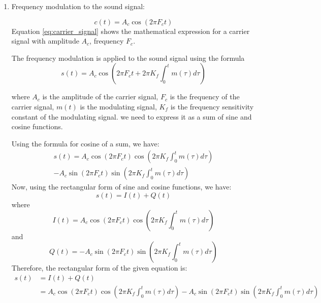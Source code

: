 \documentclass[journal,5pt,twocolumn]{IEEEtran}
\begin{document}
\begin{enumerate}
\begin{tikzpicture}[node distance=3cm, auto]
    
\end{tikzpicture}
 
 \item Frequency modulation to the sound signal:


 \begin{equation}
 c(t) = A_c \cos(2 \pi F_c t )
 \label{eq:carrier_signal} 
 \end{equation}
 Equation \ref{eq:carrier_signal} shows the mathematical expression for a carrier signal with amplitude $A_c$, frequency $F_c$. 
 
 The frequency modulation is applied to the sound signal using the formula
 \begin{equation}
 s(t) = A_c \cos \left(2 \pi F_c t +2\pi K_{f} \int_{0}^t m(\tau) d\tau \right) 
 \end{equation}

 where $A_c$ is the amplitude of the carrier signal, $F_c$ is the frequency of the carrier signal, $m(t)$ is the modulating signal, $K_{f}$ is the frequency sensitivity constant of the modulating signal.
 \iffalse
 we need to express it as a sum of sine and cosine functions.

Using the formula for cosine of a sum, we have:
\begin{align}
s(t) = A_c \cos \left(2 \pi F_c t \right) \cos \left( 2 \pi K_f \int_0^t m(\tau) d\tau \right)\\ - A_c \sin \left(2 \pi F_c t \right) \sin \left( 2 \pi K_f \int_0^t m(\tau) d\tau \right)
\end{align}
Now, using the rectangular form of sine and cosine functions, we have:
\begin{equation}
s(t) = I(t) + Q(t)
\end{equation}
where
\begin{equation}
I(t) = A_c \cos \left(2 \pi F_c t \right) \cos \left( 2 \pi K_f \int_0^t m(\tau) d\tau \right)
\end{equation}
and
\begin{equation}
Q(t) = - A_c \sin \left(2 \pi F_c t \right) \sin \left( 2 \pi K_f \int_0^t m(\tau) d\tau \right)
\end{equation}
Therefore, the rectangular form of the given equation is:
\begin{align}
s(t) &= I(t) + Q(t) 
\\&= A_c \cos \left(2 \pi F_c t \right) \cos \left( 2 \pi K_f \int_0^t m(\tau) d\tau \right) - A_c \sin \left(2 \pi F_c t \right) \sin \left( 2 \pi K_f \int_0^t m(\tau) d\tau \right)
 \end{align}
 

\end{enumerate}
\end{document}
